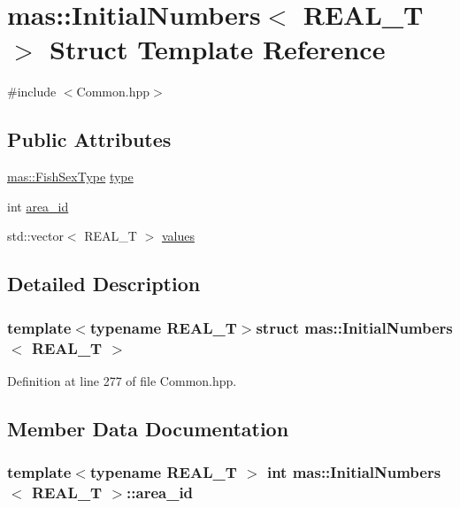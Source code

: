 \hypertarget{structmas_1_1_initial_numbers}{\section{mas\-:\-:Initial\-Numbers$<$ R\-E\-A\-L\-\_\-\-T $>$ Struct Template Reference}
\label{structmas_1_1_initial_numbers}
}


{\ttfamily \#include $<$Common.\-hpp$>$}

\subsection*{Public Attributes}
\begin{DoxyCompactItemize}
\item 
\hyperlink{namespacemas_a177aaabcef4ec0c3f390a7c9f6ad563b}{mas\-::\-Fish\-Sex\-Type} \hyperlink{structmas_1_1_initial_numbers_a6b46cfc99c64ffdb76769cc8bc363d3c}{type}
\item 
int \hyperlink{structmas_1_1_initial_numbers_ad79f343250d6295d874ec2aa963a215c}{area\-\_\-id}
\item 
std\-::vector$<$ R\-E\-A\-L\-\_\-\-T $>$ \hyperlink{structmas_1_1_initial_numbers_ab6070a2ddfcbcbbce11349c5d0aa05f2}{values}
\end{DoxyCompactItemize}


\subsection{Detailed Description}
\subsubsection*{template$<$typename R\-E\-A\-L\-\_\-\-T$>$struct mas\-::\-Initial\-Numbers$<$ R\-E\-A\-L\-\_\-\-T $>$}



Definition at line 277 of file Common.\-hpp.



\subsection{Member Data Documentation}
\hypertarget{structmas_1_1_initial_numbers_ad79f343250d6295d874ec2aa963a215c}{
\subsubsection[{area\-\_\-id}]{\setlength{\rightskip}{0pt plus 5cm}template$<$typename R\-E\-A\-L\-\_\-\-T $>$ int {\bf mas\-::\-Initial\-Numbers}$<$ R\-E\-A\-L\-\_\-\-T $>$\-::area\-\_\-id}}\label{structmas_1_1_initial_numbers_ad79f343250d6295d874ec2aa963a215c}


